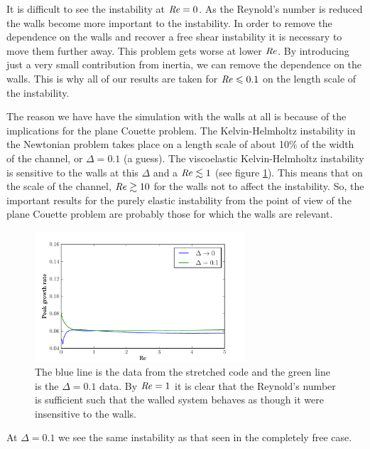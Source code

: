 \documentclass{jfm}
\newcommand\Rey{\mbox{\textit{Re}}}  %
\begin{document}
It is difficult to see the instability at $\Rey = 0$. As the Reynold's number
is reduced the walls become more important to the instability. In order to
remove the dependence on the walls and recover a free shear instability it is
necessary to move them further away. This problem gets worse at lower $\Rey$.
By introducing just a very small contribution from inertia, we can remove the
dependence on the walls. This is why all of our results are taken for $\Rey
\leq 0.1$ on the length scale of the instability.

The reason we have have the simulation with the walls at all is because of the
implications for the plane Couette problem. The Kelvin-Helmholtz instability in
the Newtonian problem takes place on a length scale of about 10\% of the width
of the channel, or $\Delta = 0.1$ (a guess). The viscoelastic Kelvin-Helmholtz
instability is sensitive to the walls at this $\Delta$ and a $\Rey \lesssim 1$
(see figure \ref{fig:vary_Re_delta_conv}). This means that on the scale of the
channel, $\Rey \gtrsim 10$ for the walls not to affect the instability. So, the
important results for the purely elastic instability from the point of view of
the plane Couette problem are probably those for which the walls are relevant. 

\begin{figure}
    \centering
    \includegraphics[width=0.7\textwidth]{vary_Re_delta_conv}
    \caption{
	The blue line is the data from the stretched code and the green line is
	the $\Delta = 0.1$ data. By $\Rey = 1$ it is clear that the Reynold's
	number is sufficient such that the walled system behaves as though it
	were insensitive to the walls.
    }
    \label{fig:vary_Re_delta_conv}
\end{figure}

At $\Delta = 0.1$ we see the same instability as that seen in the completely
free case. 
\end{document}
